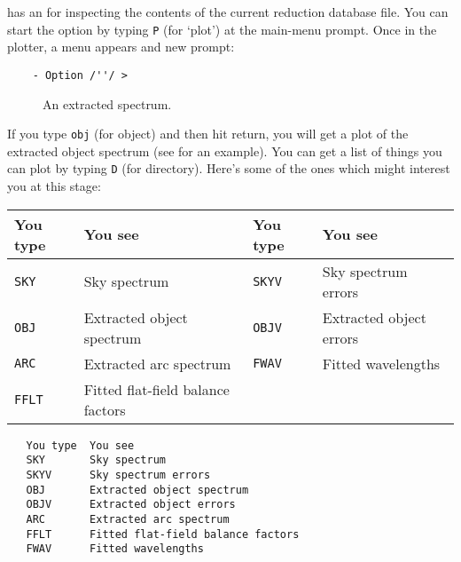  has an
for inspecting the contents of the current reduction database file.
You can start the option by typing \verb+P+ (for `plot') at the
main-menu prompt.
Once in the plotter, a menu appears and new prompt:

{
\scspec{\small}{ }
\begin{verbatim}
    - Option /''/ >
\end{verbatim}
}

\begin{htmlonly}
\begin{figure}
\begin{center}
\leavevmode\epsfysize=136mm
\parbox{140mm}{
\caption{An extracted spectrum.}
\label{fi_extracted_spectrum_again}
}
\end{center}
\end{figure}
\end{htmlonly}

If you type \verb+obj+ (for object) and then hit return, you will get a
plot of the extracted object spectrum (see
 for an example).
You can get a list of things you
can plot by typing \verb+D+ (for directory).  Here's some of the ones which
might interest you at this stage:

\begin{latexonly}
\begin{center}
\begin{tabular}{llll}
 You type & You see & You type & You see\\ \hline
 {\tt SKY}  & Sky spectrum & {\tt SKYV} & Sky spectrum errors\\
 {\tt OBJ}  & Extracted object spectrum & {\tt OBJV} & Extracted object errors\\
 {\tt ARC}  & Extracted arc spectrum & {\tt FWAV} & Fitted wavelengths\\
 {\tt FFLT} & Fitted flat-field balance factors\\ \hline
\end{tabular}
\end{center}
\end{latexonly}
\begin{htmlonly}
\begin{verbatim}
   You type  You see
   SKY       Sky spectrum
   SKYV      Sky spectrum errors
   OBJ       Extracted object spectrum
   OBJV      Extracted object errors
   ARC       Extracted arc spectrum
   FFLT      Fitted flat-field balance factors
   FWAV      Fitted wavelengths
\end{verbatim}
\end{htmlonly}

